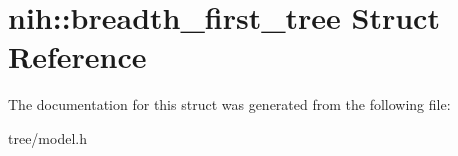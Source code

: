 \hypertarget{structnih_1_1breadth__first__tree}{
\section{nih\-:\-:breadth\-\_\-first\-\_\-tree \-Struct \-Reference}
\label{structnih_1_1breadth__first__tree}
}


\-The documentation for this struct was generated from the following file\-:\begin{DoxyCompactItemize}
\item 
tree/model.\-h\end{DoxyCompactItemize}
